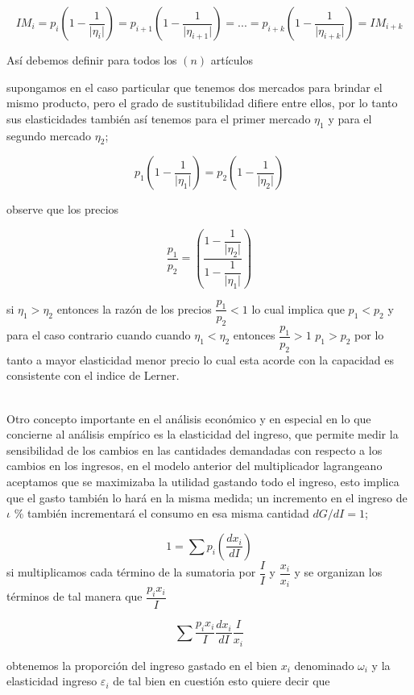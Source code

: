 \documentclass[12pt]{article}
\providecommand{\abs}[1]{\lvert#1\rvert}
\begin{document}
$$IM_{i}=p_{i}\left(1-\dfrac{1}{\abs{\eta_{i}}}\right)= p_{i+1}\left(1-\dfrac{1}{\abs{\eta_{i+1}}}\right) =  ... = p_{i+k}\left(1-\dfrac{1}{\abs{\eta_{i+k}}}\right) = IM_{i+k} $$







Así debemos definir para todos los $(n)$ artículos 


supongamos en el caso particular que tenemos dos mercados para brindar el mismo producto, pero el grado de sustitubilidad difiere entre ellos, por lo tanto sus elasticidades también así tenemos para el primer mercado $\eta_{1}$ y para el segundo mercado $\eta_{2}$;




$$p_{1}\left(1-\dfrac{1}{\abs{\eta_{1}}}\right) =p_{2}\left(1-\dfrac{1}{\abs{\eta_{2}}}\right)$$

observe que los precios 

$$ \dfrac{p_{1}}{p_{2}} = \left( \dfrac {1-\dfrac {1} {\abs {\eta_{2}} }} { 1 -\dfrac {1} { \abs { \eta_{1}}}}\right)   $$

si $\eta_{1} > \eta_{2}$ entonces la razón de los precios $ \dfrac{p_{1}}{p_{2}}< 1$ lo cual implica que $p_{1}<p_{2}$  y para el caso contrario cuando cuando $\eta_{1} < \eta_{2}$ entonces $\dfrac{p_{1}}{p_{2}}>1 $ $p_{1}>p_{2}$ por lo tanto a mayor elasticidad menor precio lo cual esta acorde con la capacidad es consistente con el indice de Lerner.

\\

Otro concepto importante en el análisis económico y en especial en lo que concierne al análisis empírico es la elasticidad del ingreso, que permite medir la sensibilidad de los cambios en las cantidades demandadas con respecto a los cambios en los ingresos, en el modelo anterior  del multiplicador lagrangeano  aceptamos que se maximizaba la utilidad gastando todo el ingreso, esto implica que el gasto también lo hará en la misma medida; un incremento en el ingreso de $\iota$ \% también incrementará el consumo en esa misma cantidad $dG/dI=1$;

$$1 = \sum p_{i}(\dfrac{dx_{i}}{dI})$$
si multiplicamos cada término de la sumatoria por $\dfrac{I}{I}$ y $\dfrac{x_{i}}{x_{i}}$ y se organizan los términos de tal manera que $\dfrac{p_{i}x_{i}}{I}$


$$ \sum \dfrac{p_{i}x_{i}}{I} \dfrac{dx_{i}}{dI} \dfrac{I}{x_{i}}$$

obtenemos la proporción del ingreso  gastado en el bien $x_{i}$ denominado $\omega_{i}$ y la elasticidad ingreso $ \varepsilon_{i}$ de tal bien en cuestión esto quiere decir que 
\end{document}
